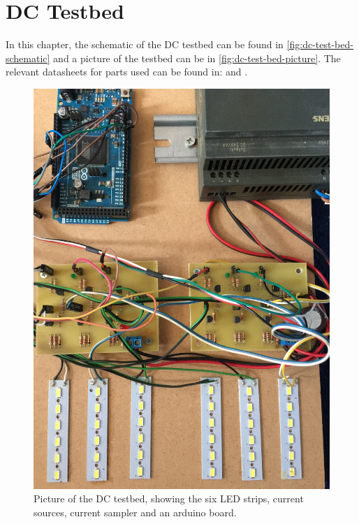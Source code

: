 
\chapter{DC Testbed}
\label{app:dc-test-bed}

In this chapter, the schematic of the DC testbed can be found in \autoref{fig:dc-test-bed-schematic} and a picture of the testbed can be in \autoref{fig:dc-test-bed-picture}.
The relevant datasheets for parts used can be found in: \cite{2n3904-npn-transistor-datasheet} and \cite{bc556-pnp-transistor-datasheet}.

\begin{figure}
	\includegraphics[angle=0,width=\textwidth,height=.9\textheight,keepaspectratio]{chapters/appendix/dc-test-bed/dc-test-bed-picture.JPG}
	\caption{Picture of the DC testbed, showing the six LED strips, current sources, current sampler and an arduino board.}
	\label{fig:dc-test-bed-picture}
\end{figure}

